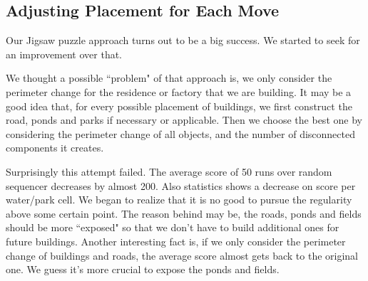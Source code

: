 \subsection{Adjusting Placement for Each Move}

Our Jigsaw puzzle approach turns out to be a big success. We started to seek for an improvement over that.

We thought a possible ``problem" of that approach is, we only consider the perimeter change for the residence or factory that we are building.
It may be a good idea that, for every possible placement of buildings, we first construct the road, ponds and parks if necessary or applicable. 
Then we choose the best one by considering the perimeter change of all objects, and the number of disconnected components it creates.

Surprisingly this attempt failed. The average score of 50 runs over random sequencer decreases by almost 200. Also statistics shows a decrease on
score per water/park cell. We began to realize that it is no good to pursue the regularity above some certain point. 
The reason behind may be, the roads, ponds and fields should be more ``exposed" so that we don't have to build additional ones
for future buildings. Another interesting fact is, if we only consider the perimeter change of buildings and roads, the average score almost gets back
to the original one. We guess it's more crucial to expose the ponds and fields.

